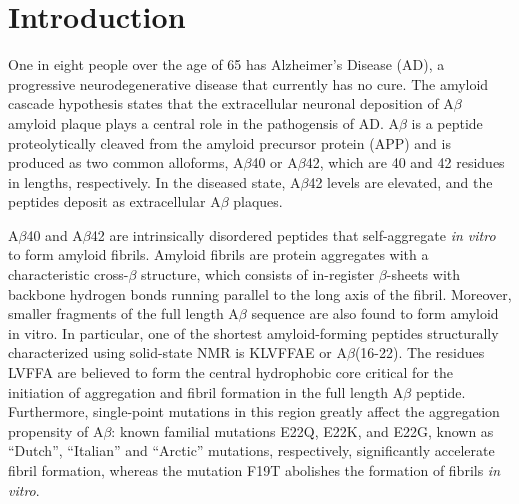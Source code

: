 \section{Introduction}

One in eight people over the age of 65 has Alzheimer's Disease (AD), a progressive neurodegenerative disease that currently has no cure.\cite{Citron:2010p214} The amyloid cascade hypothesis states that the extracellular neuronal deposition of A$\beta$ amyloid plaque plays a central role in the pathogensis of AD.\cite{Solomon:2010p177} A$\beta$ is a peptide proteolytically cleaved from the amyloid precursor protein (APP) and is produced as two common alloforms, A$\beta$40 or A$\beta$42, which are 40 and 42 residues in lengths, respectively. In the diseased state, A$\beta$42 levels are elevated, and the peptides deposit as extracellular A$\beta$ plaques.\cite{Haass:2007p226,Citron:1997p228}

A$\beta$40 and A$\beta$42 are intrinsically disordered peptides that self-aggregate \emph{in vitro} to form amyloid fibrils. Amyloid fibrils are protein aggregates with a characteristic cross-$\beta$ structure, which consists of in-register $\beta$-sheets with backbone hydrogen bonds running parallel to the long axis of the fibril.\cite{Petkova:2002p192} Moreover, smaller fragments of the full length A$\beta$ sequence are also found to form amyloid in vitro.\cite{Balbach:2000p49,Sawaya:2007p11} In particular, one of the shortest amyloid-forming peptides structurally characterized using solid-state NMR is KLVFFAE or A$\beta$(16-22).\cite{Balbach:2000p49} The residues LVFFA are believed to form the central hydrophobic core critical for the initiation of aggregation and fibril formation in the full length A$\beta$ peptide.\cite{Wood:1995p190} Furthermore, single-point mutations in this region greatly affect the aggregation propensity of A$\beta$: known familial mutations E22Q, E22K, and E22G, known as ``Dutch'', ``Italian'' and ``Arctic'' mutations, respectively, significantly accelerate fibril formation,\cite{Kim:2008ef} whereas the mutation F19T abolishes the formation of fibrils \emph{in vitro}.\cite{Esler:1996p288}


